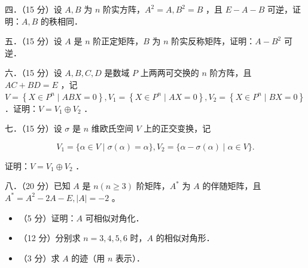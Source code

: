 \documentclass{article}
\begin{document}
四．（15 分）设 \(A, B\) 为 \(n\) 阶实方阵，\(A^{2}=A, B^{2}=B\) ，且 \(E-A-B\) 可逆，证明：\(A, B\) 的秩相同．

五．（15 分）设 \(A\) 是 \(n\) 阶正定矩阵，\(B\) 为 \(n\) 阶实反称矩阵，证明：\(A-B^{2}\) 可逆．

六．（15 分）设 \(A, B, C, D\) 是数域 \(P\) 上两两可交换的 \(n\) 阶方阵，且 \(A C+B D=E\) ，记\(V=\left\{X \in P^{n} \mid A B X=0\right\}, V_{1}=\left\{X \in P^{n} \mid A X=0\right\}, V_{2}=\left\{X \in P^{n} \mid B X=0\right\}\) ．证明：\(V=V_{1} \oplus V_{2}\) ．

七．（15 分）设 \(\sigma\) 是 \(n\) 维欧氏空间 \(V\) 上的正交变换，记

\[
V_{1}=\{\alpha \in V \mid \sigma(\alpha)=\alpha\}, V_{2}=\{\alpha-\sigma(\alpha) \mid \alpha \in V\} .
\]

证明：\(V=V_{1} \oplus V_{2}\) ．

八．（20 分）已知 \(A\) 是 \(n(n \geq 3)\) 阶矩阵，\(A^{*}\) 为 \(A\) 的伴随矩阵，且 \(A^{*}=A^{2}-2 A-E,|A|=-2\) 。

\begin{itemize}
  \item[（1）] （5 分）证明：\(A\) 可相似对角化．
  \item[（2）] （12 分）分别求 \(n=3,4,5,6\) 时，\(A\) 的相似对角形．
  \item[（3）] （3 分）求 \(A\) 的迹（用 \(n\) 表示）．
\end{itemize}
\end{document}
